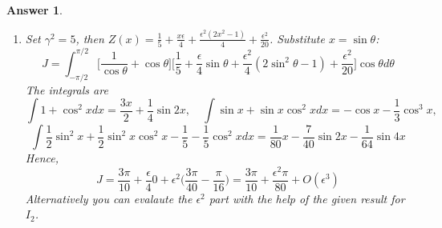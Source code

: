 \documentclass[a4paper]{article}
\newtheorem{ans}{Answer}[section]
\theoremstyle{new}
\begin{document}
\begin{ans}
\begin{enumerate}[label=(\alph*)]
\begin{enumerate}[label=(\roman*)]
gives $c=\frac{\epsilon^2}{4(\gamma^2-4)}$, $b=\frac{\epsilon}{\gamma^2-1}$ and $a=\frac{1}{\gamma^2}(1+\frac{\epsilon^2}{4})$, i.e.
$$Z=\frac{1}{\gamma^2}\bigg(1+\frac{\epsilon^2}{4}\bigg)y_0+\frac{\epsilon}{\gamma^2-1}y_1+\frac{\epsilon^2}{4(\gamma^2-4)}y_2+O(\epsilon^3)$$
with $A=\frac{1}{\gamma^2}y_0$, $B=\frac{y_1}{\gamma^2-1}$ and $C=\frac{y_0}{4\gamma^2}+\frac{y_2}{4(\gamma^2-4)}$.
\item 
Set $\gamma^2=5$, then $Z(x)=\frac{1}{5}+\frac{x\epsilon}{4}+\frac{\epsilon^2(2x^2-1)}{4}+\frac{\epsilon^2}{20}$. Substitute $x=\sin\theta$:
$$J=\int_{-\pi/2}^{\pi/2}\bigg[\frac{1}{\cos\theta}+\cos\theta\bigg]\bigg[\frac{1}{5}+\frac{\epsilon}{4}\sin\theta+\frac{\epsilon^2}{4}(2\sin^2\theta-1)+\frac{\epsilon^2}{20}\bigg]\cos\theta d\theta$$
The integrals are $$\int 1+\cos^2xdx=\frac{3x}{2}+\frac{1}{4}\sin 2x,\quad\int\sin x+\sin x\cos^2xdx=-\cos x-\frac{1}{3}\cos^3x,$$
$$\int\frac{1}{2}\sin^2x+\frac{1}{2}\sin^2x\cos^2x-\frac{1}{5}-\frac{1}{5}\cos^2xdx=\frac{1}{80}x-\frac{7}{40}\sin 2x-\frac{1}{64}\sin 4x$$ Hence,
$$J=\frac{3\pi}{10}+\frac{\epsilon}{4}0+\epsilon^2\bigg(\frac{3\pi}{40}-\frac{\pi}{16}\bigg)=\frac{3\pi}{10}+\frac{\epsilon^2\pi}{80}+O(\epsilon^3)$$
Alternatively you can evalaute the $\epsilon^2$ part with the help of the given result for $I_2$.
\end{enumerate}
\end{enumerate}
\end{ans}
\newpage
\end{document}
